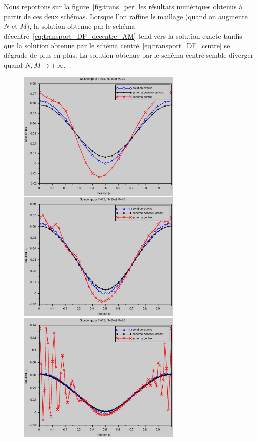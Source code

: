 \documentclass[12pt,a4paper,twoside]{article}
\begin{document}
Nous reportons sur la figure~\ref{fig:trans_per} 
les r\'esultats num\'eriques obtenus \`a partir de ces deux sch\'emas.
Lorsque l'on raffine le maillage (quand on augmente $N$ et $M$),
la solution obtenue par le sch\'ema d\'ecentr\'e~\eqref{eq:transport_DF_decentre_AM}
tend vers la solution exacte
tandis que la solution obtenue par le sch\'ema centr\'e~\eqref{eq:transport_DF_centre}
se d\'egrade de plus en plus. La solution obtenue par le sch\'ema centr\'e semble
diverger quand $N, M \to +\infty$.

\begin{figure}[h]
  \centering
  \includegraphics[width = 8cm]{Figures/transport_per_N15.eps}
  \includegraphics[width = 8cm]{Figures/transport_per_N30.eps}
  \includegraphics[width = 8cm]{Figures/transport_per_N60.eps}

\end{figure}
\end{document}
